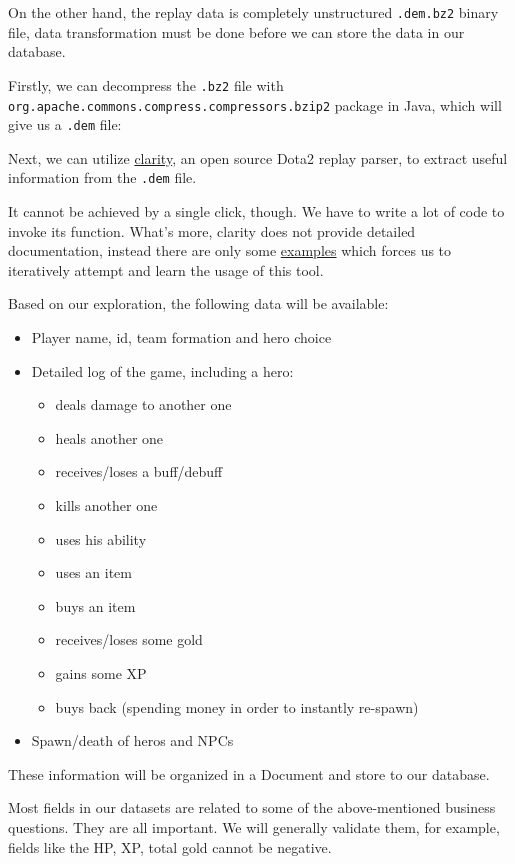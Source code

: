 \documentclass{article}
\newcommand{\codeinline}[1]{
	\texttt{#1}
}
\begin{document}
On the other hand, the replay data is completely unstructured \codeinline{.dem.bz2} binary file,
data transformation must be done before we can store the data in our database.

Firstly, we can decompress the \codeinline{.bz2} file with \codeinline{org.apache.commons.compress.compressors.bzip2} package in Java,
which will give us a \codeinline{.dem} file:

Next, we can utilize \href{https://github.com/skadistats/clarity}{clarity},
an open source Dota2 replay parser, to extract useful information from the \codeinline{.dem} file.

It cannot be achieved by a single click, though. We have to write a lot of code to invoke its function.
What's more, clarity does not provide detailed documentation, instead there are only some \href{https://github.com/skadistats/clarity-examples}{examples} which forces us to iteratively attempt and learn the usage of this tool.

Based on our exploration, the following data will be available:

\begin{itemize}
	\item Player name, id, team formation and hero choice
	\item Detailed log of the game, including a hero:
	\begin{itemize}
		\item deals damage to another one
		\item heals another one
		\item receives/loses a buff/debuff
		\item kills another one
		\item uses his ability
		\item uses an item
		\item buys an item
		\item receives/loses some gold
		\item gains some XP
		\item buys back (spending money in order to instantly re-spawn)
	\end{itemize}
	\item Spawn/death of heros and NPCs
\end{itemize}

These information will be organized in a Document and store to our database.

Most fields in our datasets are related to some of the above-mentioned business questions.
They are all important.
We will generally validate them, for example, fields like the HP, XP, total gold cannot be negative.
\end{document}
